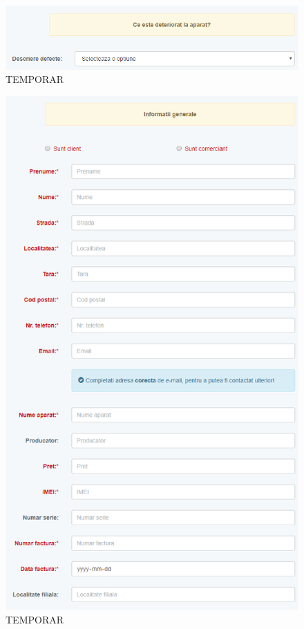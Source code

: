 	\begin{figure}
		\includegraphics[width=\linewidth]{../imagini/register_deteriorat.png}
		\caption{TEMPORAR}
		\label{fig:TEMP}
	\end{figure}
	\begin{figure}
		\includegraphics[width=\linewidth]{../imagini/register_informatii_generale.png}
		\caption{TEMPORAR}
		\label{fig:TEMP}
	\end{figure}
